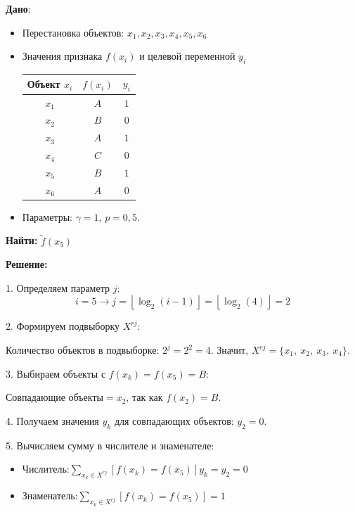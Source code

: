 \textbf{Дано}:
\begin{itemize}
    \item Перестановка объектов: $x_1, x_2, x_3, x_4, x_5, x_6$
    \item Значения признака  $f(x_i)$ и целевой переменной $y_i$
          \begin{table}[ht]
              \centering
              \begin{tabular}{c|c|c}
                  Объект \( x_i \) & \( f(x_i) \) & \( y_i \) \\
                  \hline
                  \( x_1 \)        & \( A \)      & \( 1 \)   \\
                  \( x_2 \)        & \( B \)      & \( 0 \)   \\
                  \( x_3 \)        & \( A \)      & \( 1 \)   \\
                  \( x_4 \)        & \( C \)      & \( 0 \)   \\
                  \( x_5 \)        & \( B \)      & \( 1 \)   \\
                  \( x_6 \)        & \( A \)      & \( 0 \)   \\
              \end{tabular}
          \end{table}
    \item Параметры: $\gamma = 1$, $p = 0{,}5$.
\end{itemize}

\textbf{Найти:} $\tilde{f}(x_5)$


\textbf{Решение:}

1. Определяем параметр $j$:
$$
    i = 5 \rightarrow j = \left\lfloor \log_2(i - 1) \right\rfloor = \left\lfloor \log_2(4) \right\rfloor = 2
$$

2. Формируем подвыборку $X^{rj}$:

Количество объектов в подвыборке: $2^j = 2^2 = 4$. Значит, $X^{rj} = \{ x_1, \ x_2, \ x_3, \ x_4 \}$.

3. Выбираем объекты с \( f(x_k) = f(x_5) = B \):

$\text{Совпадающие объекты} = x_2$, так как $f(x_2) = B$.

4. Получаем значения $y_k$ для совпадающих объектов: $y_2 = 0$.

5. Вычисляем сумму в числителе и знаменателе:
\begin{itemize}
    \item $\text{Числитель:} \sum\limits_{x_k \in X^{rj}} [f(x_k) = f(x_5)] y_k = y_2 = 0$
    \item $\text{Знаменатель:} \sum\limits_{x_k \in X^{rj}} [f(x_k) = f(x_5)] = 1$
\end{itemize}

